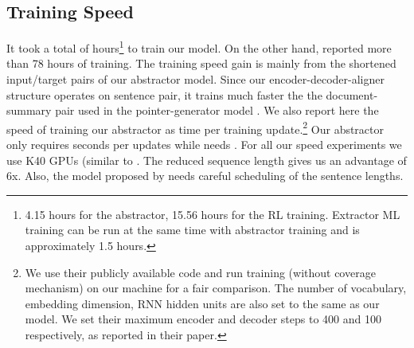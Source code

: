 \documentclass[11pt,a4paper]{article}
\begin{document}
\subsection{Training Speed}
It took a total of  hours\footnote{4.15 hours for the abstractor, 15.56 hours for the RL training. Extractor ML training can be run at the same time with abstractor training and is approximately 1.5 hours.
} to train our model. On the other hand, \citet{get_to_the_point} reported more than 78 hours of training.
The training speed gain is mainly from the shortened input/target pairs of our abstractor model. 
Since our encoder-decoder-aligner structure operates on sentence pair, it trains much faster the the document-summary pair used in the pointer-generator model \citep{get_to_the_point}.
We also report here the speed of training our abstractor as time per training update.\footnote{We use their publicly available code and run training (without coverage mechanism) on our machine for a fair comparison.
The number of vocabulary, embedding dimension, RNN hidden units are also set to the same as our model. We set their maximum encoder and decoder steps to 400 and 100 respectively, as reported in their paper.
}
Our abstractor only requires  seconds per updates while \citet{get_to_the_point} needs .
For all our speed experiments we use K40 GPUs (similar to \citet{get_to_the_point}.
The reduced sequence length gives us an advantage of 6x.
Also, the model proposed by \citet{get_to_the_point} needs careful scheduling of the sentence lengths.  
\end{document}
